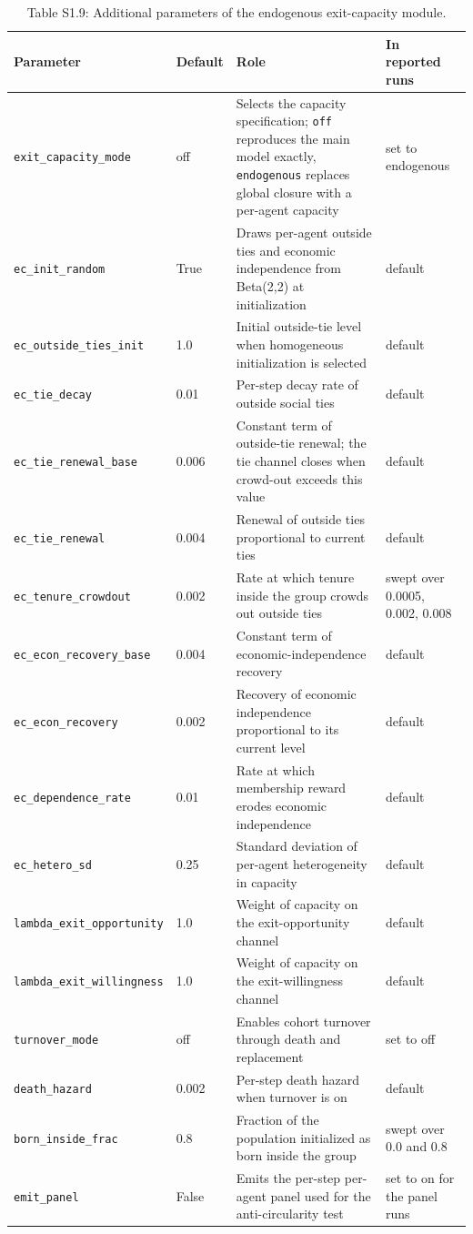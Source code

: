 \documentclass[12pt]{article}
\begin{document}
\begin{table}[htbp]
\centering
\footnotesize
\caption{Table S1.9: Additional parameters of the endogenous exit-capacity module.}
\begin{tabular}{p{4.9cm}p{1.3cm}p{4.5cm}p{2.4cm}}
\toprule
Parameter & Default & Role & In reported runs \\
\midrule
\texttt{exit\_capacity\_mode} & off & Selects the capacity specification; \texttt{off} reproduces the main model exactly, \texttt{endogenous} replaces global closure with a per-agent capacity & set to endogenous \\
\texttt{ec\_init\_random} & True & Draws per-agent outside ties and economic independence from Beta(2,2) at initialization & default \\
\texttt{ec\_outside\_ties\_init} & 1.0 & Initial outside-tie level when homogeneous initialization is selected & default \\
\texttt{ec\_tie\_decay} & 0.01 & Per-step decay rate of outside social ties & default \\
\texttt{ec\_tie\_renewal\_base} & 0.006 & Constant term of outside-tie renewal; the tie channel closes when crowd-out exceeds this value & default \\
\texttt{ec\_tie\_renewal} & 0.004 & Renewal of outside ties proportional to current ties & default \\
\texttt{ec\_tenure\_crowdout} & 0.002 & Rate at which tenure inside the group crowds out outside ties & swept over 0.0005, 0.002, 0.008 \\
\texttt{ec\_econ\_recovery\_base} & 0.004 & Constant term of economic-independence recovery & default \\
\texttt{ec\_econ\_recovery} & 0.002 & Recovery of economic independence proportional to its current level & default \\
\texttt{ec\_dependence\_rate} & 0.01 & Rate at which membership reward erodes economic independence & default \\
\texttt{ec\_hetero\_sd} & 0.25 & Standard deviation of per-agent heterogeneity in capacity & default \\
\texttt{lambda\_exit\_opportunity} & 1.0 & Weight of capacity on the exit-opportunity channel & default \\
\texttt{lambda\_exit\_willingness} & 1.0 & Weight of capacity on the exit-willingness channel & default \\
\texttt{turnover\_mode} & off & Enables cohort turnover through death and replacement & set to off \\
\texttt{death\_hazard} & 0.002 & Per-step death hazard when turnover is on & default \\
\texttt{born\_inside\_frac} & 0.8 & Fraction of the population initialized as born inside the group & swept over 0.0 and 0.8 \\
\texttt{emit\_panel} & False & Emits the per-step per-agent panel used for the anti-circularity test & set to on for the panel runs \\
\bottomrule
\end{tabular}
\end{table}
\end{document}
